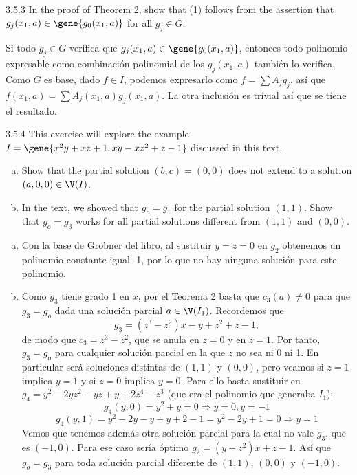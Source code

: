 \documentclass[twoside]{article}
\begin{document}
\newpage

\begin{ejercicio}{3.5.3}
In the proof of Theorem 2, show that (1) follows from the assertion that $g_j(x_1,a) \in \gene{g_0(x_1,a)}$ for all $g_j \in G$.
\end{ejercicio}
\begin{solucion}
Si todo $g_j \in G$ verifica que $g_j(x_1,a) \in \gene{g_0(x_1,a)}$, entonces todo polinomio expresable como combinación polinomial de los $g_j(x_1,a)$ también lo verifica. Como $G$ es base, dado $f\in I$, podemos expresarlo como $f=\sum A_jg_j$, así que $f(x_1,a)=\sum A_j(x_1,a)g_j(x_1,a)$. La otra inclusión es trivial así que se tiene el resultado. 
\end{solucion}
\newpage

\begin{ejercicio}{3.5.4}
This exercise will explore the example $I = \gene{x^2y+xz+1, xy-xz^2+z-1}$ discussed in this text.
\begin{enumerate}[a.]
\item Show that the partial solution $(b,c) = (0,0)$ does not extend to a solution $(a,0,0) \in \V(I)$.
\item In the text, we showed that $g_o = g_1$ for the partial solution $(1,1)$.
Show that $g_o = g_3$ works for all partial solutions different from $(1,1)$ and $(0,0)$.
\end{enumerate}
\end{ejercicio}
\begin{solucion}
\begin{enumerate}[a.]
\item Con la base de Gröbner del libro, al sustituir $y=z=0$ en $g_2$ obtenemos un polinomio constante igual -1, por lo que no hay ninguna solución para este polinomio. 
\item Como $g_3$ tiene grado 1 en $x$, por el Teorema 2 basta que $c_3(a)\neq 0$ para que $g_3=g_o$ dada una solución parcial $a\in\V(I_1)$. Recordemos que
\[
g_3=(z^3 − z^2)x − y + z^2 + z − 1,
\]
de modo que $c_3=z^3-z^2$, que se anula en $z=0$ y en $z=1$. Por tanto, $g_3=g_o$ para cualquier solución parcial en la que $z$ no sea ni 0 ni 1. En particular será soluciones distintas de $(1,1)$ y $(0,0)$, pero veamos  si $z=1$ implica $y=1$ y si $z=0$ implica $y=0$. Para ello basta sustituir en $g_4=y^2 − 2yz^2 − yz + y + 2z^4 − z^3$ (que era el polinomio que generaba $I_1$):
\[
g_4(y,0)=y^2+y=0\Rightarrow y=0, y=-1
\]
\[
g_4(y,1)=y^2-2y-y+y+2-1=y^2-2y+1=0\Rightarrow y=1
\]
Vemos que tenemos además otra solución parcial para la cual no vale $g_3$, que es $(-1,0)$. Para ese caso sería óptimo $g_2=(y − z^2)x + z − 1$. Así que $g_o=g_3$ para toda solución parcial diferente de $(1,1)$, $(0,0)$ y $(-1,0)$. 
\end{enumerate}
\end{solucion}
\end{document}
